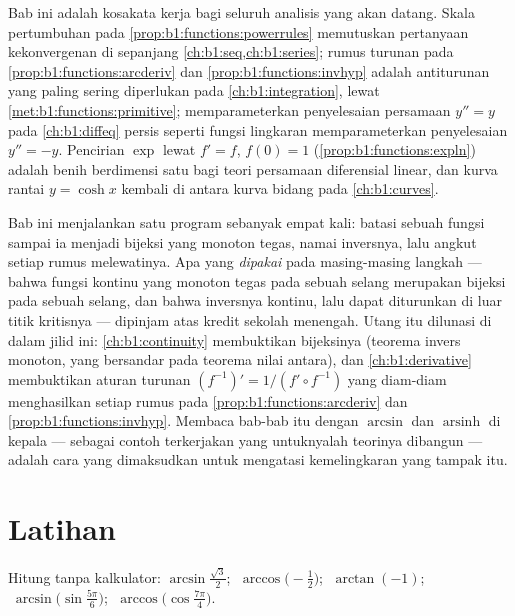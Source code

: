 \begin{remark}\label{rem:b1:functions:whereused}
Bab ini adalah kosakata kerja bagi seluruh analisis yang akan datang.
Skala pertumbuhan pada \cref{prop:b1:functions:powerrules} memutuskan
pertanyaan kekonvergenan di sepanjang
\cref{ch:b1:seq,ch:b1:series}; rumus turunan pada
\cref{prop:b1:functions:arcderiv} dan
\cref{prop:b1:functions:invhyp} adalah antiturunan yang paling sering
diperlukan pada \cref{ch:b1:integration}, lewat
\cref{met:b1:functions:primitive}; 
memparameterkan penyelesaian persamaan $y'' = y$ pada
\cref{ch:b1:diffeq} persis seperti fungsi lingkaran memparameterkan
penyelesaian $y'' = -y$. Pencirian $\exp$ lewat $f' = f$,
$f(0) = 1$ (\cref{prop:b1:functions:expln}) adalah benih berdimensi satu
bagi teori persamaan diferensial linear, dan
kurva rantai $y = \cosh x$ kembali di antara kurva bidang pada
\cref{ch:b1:curves}.
\end{remark}

\begin{remark}\label{rem:b1:functions:interlude}
Bab ini menjalankan satu program sebanyak empat kali: batasi sebuah fungsi
sampai ia menjadi bijeksi yang monoton tegas, namai inversnya,
lalu angkut setiap rumus melewatinya. Apa yang \emph{dipakai} pada masing-masing
langkah --- bahwa fungsi kontinu yang monoton tegas pada sebuah
selang merupakan bijeksi pada sebuah selang, dan bahwa inversnya
kontinu, lalu dapat diturunkan di luar titik kritisnya --- dipinjam
atas kredit sekolah menengah. Utang itu dilunasi di dalam jilid
ini: \cref{ch:b1:continuity} membuktikan  bijeksinya
(teorema invers monoton, yang bersandar pada teorema nilai
antara), dan \cref{ch:b1:derivative} membuktikan aturan turunan
$(f^{-1})' = 1/(f' \circ f^{-1})$ yang diam-diam menghasilkan setiap
rumus pada \cref{prop:b1:functions:arcderiv} dan
\cref{prop:b1:functions:invhyp}. Membaca bab-bab itu dengan
$\arcsin$ dan $\operatorname{arsinh}$ di kepala --- sebagai contoh
terkerjakan yang untuknyalah teorinya dibangun --- adalah cara yang
dimaksudkan untuk mengatasi kemelingkaran yang tampak itu.
\end{remark}

\section{Latihan}

\begin{exercise}[$\star$]\label{exo:b1:functions:1}
Hitung tanpa kalkulator: $\arcsin\frac{\sqrt 3}{2}$;
$\;\arccos\bigl(-\frac 12\bigr)$; $\;\arctan(-1)$;
$\;\arcsin\bigl(\sin\frac{5\pi}{6}\bigr)$;
$\;\arccos\bigl(\cos\frac{7\pi}{4}\bigr)$.
\end{exercise}

